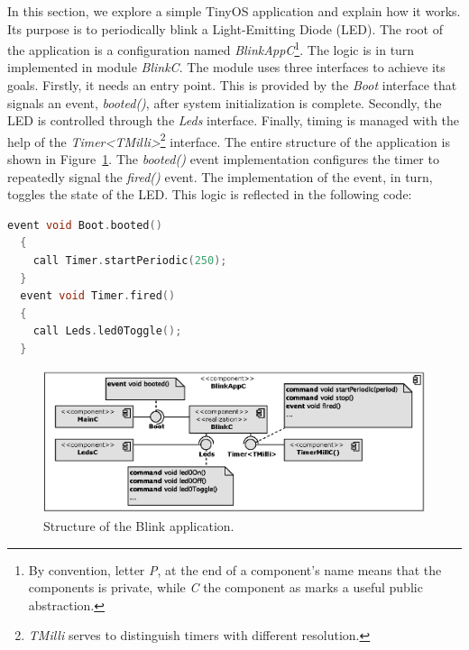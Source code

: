 In this section, we explore a simple TinyOS application and explain how it works. Its purpose is to periodically blink a Light-Emitting Diode (LED). The root of the application is a configuration named \emph{BlinkAppC}\footnote{By convention, letter \emph{P}, at the end of a component's name means that the components is private, while \emph{C} the component as marks a useful public abstraction.}. The logic is in turn implemented in module \emph{BlinkC}. The module uses three interfaces to achieve its goals. Firstly, it needs an entry point. This is provided by the \emph{Boot} interface that signals an event, \emph{booted()}, after system initialization is complete.  Secondly, the LED is controlled through the \emph{Leds} interface. Finally, timing is managed with the help of the \emph{Timer<TMilli>}\footnote{\emph{TMilli} serves to distinguish timers with different resolution.} interface. The entire structure of the application is shown in Figure~\ref{fig:app_anatomy}.  The \emph{booted()} event implementation configures the timer to repeatedly signal the \emph{fired()} event. The implementation of the event, in turn, toggles the state of the LED. This logic is reflected in the following code:

\begin{lstlisting}[numbers=none, keywordstyle=\bfseries, language=C]
  event void Boot.booted()
  {
    call Timer.startPeriodic(250);
  }
  event void Timer.fired()
  {
    call Leds.led0Toggle();
  }
\end{lstlisting}

\begin{figure}[h]
  \centering
  \includegraphics[width=1.01\textwidth]{diagrams/app_anatomy.eps}
  \caption{Structure of the Blink application.}
  \label{fig:app_anatomy}
\end{figure}

